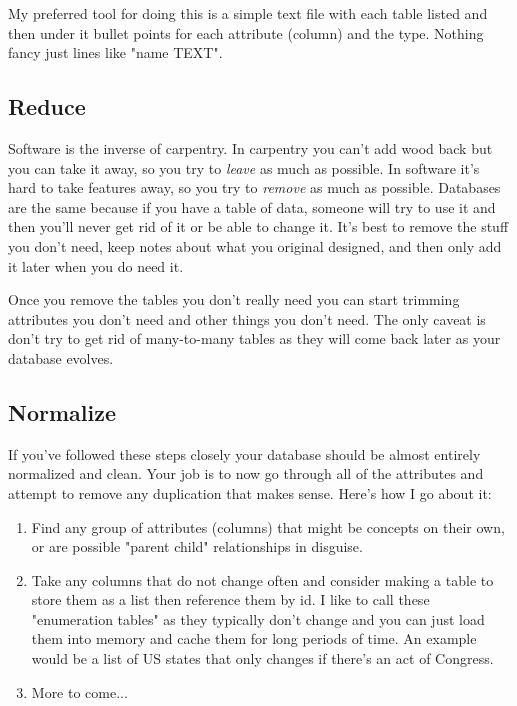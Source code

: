 My preferred tool for doing this is a simple text file with each table listed and then under it
bullet points for each attribute (column) and the type.  Nothing fancy just lines like "name TEXT".


\subsection{Reduce}

Software is the inverse of carpentry.  In carpentry you can't add wood back but you can take it away,
so you try to \emph{leave} as much as possible.  In software it's hard to take features away, so you try
to \emph{remove} as much as possible.  Databases are the same because if you have a table of data,
someone will try to use it and then you'll never get rid of it or be able to change it.  It's best
to remove the stuff you don't need, keep notes about what you original designed, and then only add
it later when you do need it.

Once you remove the tables you don't really need you can start trimming attributes you don't need
and other things you don't need.  The only caveat is don't try to get rid of many-to-many tables
as they will come back later as your database evolves.

\subsection{Normalize}

If you've followed these steps closely your database should be almost entirely normalized and
clean.  Your job is to now go through all of the attributes and attempt to remove any duplication
that makes sense.  Here's how I go about it:

\begin{enumerate}
\item Find any group of attributes (columns) that might be concepts on their own, or are
    possible "parent child" relationships in disguise.
\item Take any columns that do not change often and consider making a table to
    store them as a list then reference them by id.  I like to call these
    "enumeration tables" as they typically don't change and you can just load them
    into memory and cache them for long periods of time.  An example would be a
    list of US states that only changes if there's an act of Congress.
\item More to come...
\end{enumerate}


